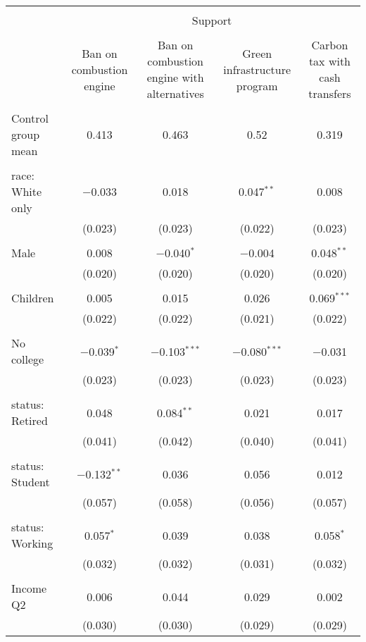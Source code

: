 
\begin{tabular}{@{\extracolsep{5pt}}lcccc} 
\\[-1.8ex]\hline 
\hline \\[-1.8ex] 
 & \multicolumn{4}{c}{Support} \\ 
\cline{2-5} 
\\[-1.8ex] & Ban on combustion engine & Ban on combustion engine with alternatives & Green infrastructure program & Carbon tax with cash transfers \\ 
\hline \\[-1.8ex] 
 Control group mean & 0.413 & 0.463 & 0.52 & 0.319  \\ \hline \\[-1.8ex] race: White only & $-$0.033 & 0.018 & 0.047$^{**}$ & 0.008 \\ 
  & (0.023) & (0.023) & (0.022) & (0.023) \\ 
  & & & & \\ 
 Male & 0.008 & $-$0.040$^{*}$ & $-$0.004 & 0.048$^{**}$ \\ 
  & (0.020) & (0.020) & (0.020) & (0.020) \\ 
  & & & & \\ 
 Children & 0.005 & 0.015 & 0.026 & 0.069$^{***}$ \\ 
  & (0.022) & (0.022) & (0.021) & (0.022) \\ 
  & & & & \\ 
 No college & $-$0.039$^{*}$ & $-$0.103$^{***}$ & $-$0.080$^{***}$ & $-$0.031 \\ 
  & (0.023) & (0.023) & (0.023) & (0.023) \\ 
  & & & & \\ 
 status: Retired & 0.048 & 0.084$^{**}$ & 0.021 & 0.017 \\ 
  & (0.041) & (0.042) & (0.040) & (0.041) \\ 
  & & & & \\ 
 status: Student & $-$0.132$^{**}$ & 0.036 & 0.056 & 0.012 \\ 
  & (0.057) & (0.058) & (0.056) & (0.057) \\ 
  & & & & \\ 
 status: Working & 0.057$^{*}$ & 0.039 & 0.038 & 0.058$^{*}$ \\ 
  & (0.032) & (0.032) & (0.031) & (0.032) \\ 
  & & & & \\ 
 Income Q2 & 0.006 & 0.044 & 0.029 & 0.002 \\ 
  & (0.030) & (0.030) & (0.029) & (0.029) \\ 

\end{tabular}
